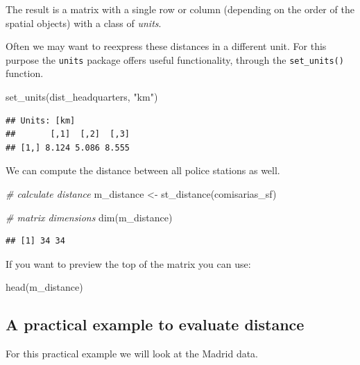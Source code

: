 \documentclass[
  krantz2]{krantz}
\makeatletter
\newenvironment{Shaded}{\begin{snugshade}}{\end{snugshade}}
\newcommand{\CommentTok}[1]{\textcolor[rgb]{0.37,0.37,0.37}{\textit{#1}}}
\newcommand{\FunctionTok}[1]{\textcolor[rgb]{0,0,0}{#1}}
\newcommand{\NormalTok}[1]{#1}
\newcommand{\OtherTok}[1]{\textcolor[rgb]{0.37,0.37,0.37}{#1}}
\newcommand{\StringTok}[1]{\textcolor[rgb]{0.5,0.5,0.5}{#1}}
\newenvironment{kframe}{%
\medskip{}
\setlength{\fboxsep}{.8em}
 \def\at@end@of@kframe{}%
 \ifinner\ifhmode%
  \def\at@end@of@kframe{\end{minipage}}%
  \begin{minipage}{\columnwidth}%
 \fi\fi%
 \def\FrameCommand##1{\hskip\@totalleftmargin \hskip-\fboxsep
 \colorbox{shadecolor}{##1}\hskip-\fboxsep
     \hskip-\linewidth \hskip-\@totalleftmargin \hskip\columnwidth}%
 \MakeFramed {\advance\hsize-\width
   \@totalleftmargin\z@ \linewidth\hsize
   \@setminipage}}%
 {\par\unskip\endMakeFramed%
 \at@end@of@kframe}
\renewenvironment{Shaded}{\begin{kframe}}{\end{kframe}}
\makeatother
\begin{document}
The result is a matrix with a single row or column (depending on the order of the spatial objects) with a class of \emph{units}.

Often we may want to reexpress these distances in a different unit. For this purpose the \texttt{units} package offers useful functionality, through the \texttt{set\_units()} function.

\begin{Shaded}
\begin{Highlighting}[]
\FunctionTok{set\_units}\NormalTok{(dist\_headquarters, }\StringTok{"km"}\NormalTok{)}
\end{Highlighting}
\end{Shaded}

\begin{verbatim}
## Units: [km]
##       [,1]  [,2]  [,3]
## [1,] 8.124 5.086 8.555
\end{verbatim}

We can compute the distance between all police stations as well.

\begin{Shaded}
\begin{Highlighting}[]
\CommentTok{\# calculate distance}
\NormalTok{m\_distance }\OtherTok{\textless{}{-}} \FunctionTok{st\_distance}\NormalTok{(comisarias\_sf)}

\CommentTok{\# matrix dimensions}
\FunctionTok{dim}\NormalTok{(m\_distance)}
\end{Highlighting}
\end{Shaded}

\begin{verbatim}
## [1] 34 34
\end{verbatim}

If you want to preview the top of the matrix you can use:

\begin{Shaded}
\begin{Highlighting}[]
\FunctionTok{head}\NormalTok{(m\_distance)}
\end{Highlighting}
\end{Shaded}

\hypertarget{a-practical-example-to-evaluate-distance}{%
\subsection{A practical example to evaluate distance}\label{a-practical-example-to-evaluate-distance}}

For this practical example we will look at the Madrid data.
\end{document}
